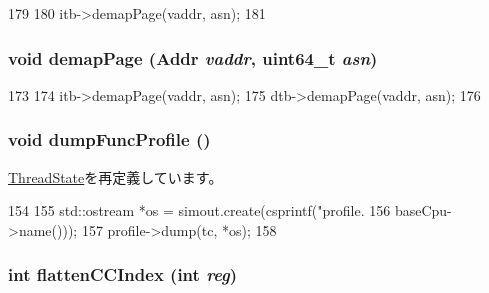 \begin{DoxyCode}
179     {
180         itb->demapPage(vaddr, asn);
181     }
\end{DoxyCode}
\hypertarget{classSimpleThread_a2d698ff909513b48a1263f8a5440e067}{
\subsubsection[{demapPage}]{\setlength{\rightskip}{0pt plus 5cm}void demapPage ({\bf Addr} {\em vaddr}, \/  uint64\_\-t {\em asn})}}
\label{classSimpleThread_a2d698ff909513b48a1263f8a5440e067}



\begin{DoxyCode}
173     {
174         itb->demapPage(vaddr, asn);
175         dtb->demapPage(vaddr, asn);
176     }
\end{DoxyCode}
\hypertarget{classSimpleThread_a13fa12d1779a94a1e0b968946a1367c7}{
\subsubsection[{dumpFuncProfile}]{\setlength{\rightskip}{0pt plus 5cm}void dumpFuncProfile ()}}
\label{classSimpleThread_a13fa12d1779a94a1e0b968946a1367c7}


\hyperlink{structThreadState_a13fa12d1779a94a1e0b968946a1367c7}{ThreadState}を再定義しています。


\begin{DoxyCode}
154 {
155     std::ostream *os = simout.create(csprintf("profile.%
156                                               baseCpu->name()));
157     profile->dump(tc, *os);
158 }
\end{DoxyCode}
\hypertarget{classSimpleThread_ac33d74353e36a595ec48962cd0446320}{
\subsubsection[{flattenCCIndex}]{\setlength{\rightskip}{0pt plus 5cm}int flattenCCIndex (int {\em reg})}}
\label{classSimpleThread_ac33d74353e36a595ec48962cd0446320}



